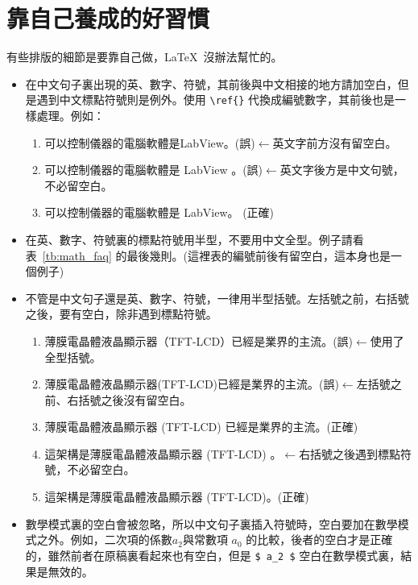 
\chapter{靠自己養成的好習慣}
\label{sec:habbit}

有些排版的細節是要靠自己做，\LaTeX\ 沒辦法幫忙的。
	\begin{itemize}
	\item 在中文句子裏出現的英、數字、符號，其前後與中文相接的地方請加空白，但是遇到中文標點符號則是例外。使用 \verb+\ref{}+ 代換成編號數字，其前後也是一樣處理。例如：
		\begin{enumerate}
		\item 可以控制儀器的電腦軟體是LabView。(誤)\quad$\leftarrow$英文字前方沒有留空白。
		\item 可以控制儀器的電腦軟體是 LabView 。(誤)\quad$\leftarrow$英文字後方是中文句號，不必留空白。
		\item 可以控制儀器的電腦軟體是 LabView。 (正確)
		\end{enumerate}

	\item 在英、數字、符號裏的標點符號用半型，不要用中文全型。例子請看表~\ref{tb:math_faq} 的最後幾則。(這裡表的編號前後有留空白，這本身也是一個例子)
	
	\item 不管是中文句子還是英、數字、符號，一律用半型括號。左括號之前，右括號之後，要有空白，除非遇到標點符號。
		\begin{enumerate}
		\item 薄膜電晶體液晶顯示器（TFT-LCD）已經是業界的主流。(誤)\quad$\leftarrow$使用了全型括號。
		
		\item 薄膜電晶體液晶顯示器(TFT-LCD)已經是業界的主流。(誤)\quad$\leftarrow$左括號之前、右括號之後沒有留空白。
		
		\item 薄膜電晶體液晶顯示器 (TFT-LCD) 已經是業界的主流。(正確)
		
		\item 這架構是薄膜電晶體液晶顯示器 (TFT-LCD) 。\quad$\leftarrow$右括號之後遇到標點符號，不必留空白。
		
		\item 這架構是薄膜電晶體液晶顯示器 (TFT-LCD)。(正確)
		\end{enumerate}

	\item 數學模式裏的空白會被忽略，所以中文句子裏插入符號時，空白要加在數學模式之外。例如，二次項的係數$ a_2 $與常數項 $a_0$ 的比較，後者的空白才是正確的，雖然前者在原稿裏看起來也有空白，但是 \verb+$ a_2 $+ 空白在數學模式裏，結果是無效的。


\end{itemize}
